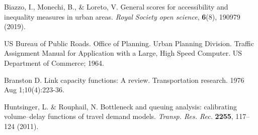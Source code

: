 \documentclass[aps,preprint]{revtex4-1}
\begin{document}
\begin{thebibliography}{prsty}
%
%
%
%
%
%
%
%
 Biazzo, I., Monechi, B., \& Loreto, V.  General scores for accessibility and inequality measures in urban areas. {\it Royal Society open science}, {\bf 6}(8), 190979 (2019).
%
%
%
%
%
%
%
%



 US Bureau of Public Roads. Office of Planning. Urban Planning Division. Traffic Assignment Manual for Application with a Large, High Speed Computer. US Department of Commerce; 1964.


 Branston D. Link capacity functions: A review. Transportation research. 1976 Aug 1;10(4):223-36.

 Huntsinger, L. \& Rouphail, N. Bottleneck and queuing analysis: calibrating volume–delay functions of travel demand models. {\it Transp. Res. Rec.} {\bf 2255}, 117–124 (2011).


\end{thebibliography}
\end{document}
